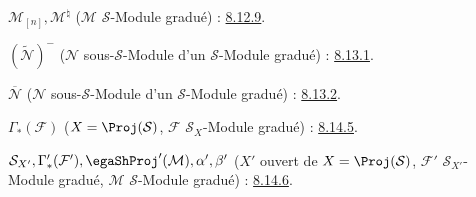 $\mathcal{M}_{[n]},\mathcal{M}^{\natural}$
($\mathcal{M}$ $\mathcal{S}$-Module gradué) : \hyperref[II.8.12.9-fr]{8.12.9}.

$(\widetilde{\mathcal{N}})^-$
($\mathcal{N}$ sous-$\mathcal{S}$-Module d'un $\mathcal{S}$-Module gradué) : \hyperref[II.8.13.1-fr]{8.13.1}.

$\overline{\mathcal{N}}$
($\mathcal{N}$ sous-$\mathcal{S}$-Module d'un $\mathcal{S}$-Module gradué) : \hyperref[II.8.13.2-fr]{8.13.2}.

$\Gamma_*(\mathcal{F})$
($X=\Proj(\mathcal{S})$, $\mathcal{F}$ $\mathcal{S}_X$-Module gradué) : \hyperref[II.8.14.5-fr]{8.14.5}.

$\mathcal{S}_{X'},\Gamma'_*(\mathcal{F}'),\egaShProj'(\mathcal{M}),
\alpha',\beta'$
($X'$ ouvert de $X=\Proj(\mathcal{S})$, $\mathcal{F}'$ $\mathcal{S}_{X'}$-Module gradué,
$\mathcal{M}$ $\mathcal{S}$-Module gradué) : \hyperref[II.8.14.6-fr]{8.14.6}.

\endgroup

\clearpage
